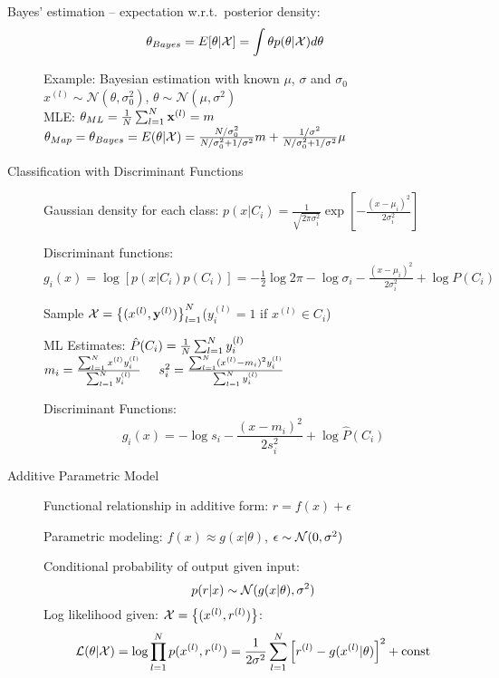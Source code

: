     Bayes' estimation -- expectation w.r.t.\ posterior density:
    \[ \theta_{Bayes} = E[\theta|\mathcal{X}] = \int \theta p(\theta|\mathcal{X})d\theta\]
\begin{description}
\item[] Example: Bayesian estimation with known $\mu$, $\sigma$ and $\sigma_0$\\
        $x^{(l)} \sim \mathcal{N}(\theta, \sigma_0^2)$, 
        $\theta  \sim \mathcal{N}(\mu, \sigma^2)$\\
         MLE: $\theta_{ML} = \frac{1}{N}\sum_{l=1}^N\mathbf{x}^{(l)}=m$ \\
         $\theta_{Map} = \theta_{Bayes}  =E(\theta|\mathcal{X}) = 
            \frac{N/\sigma_0^2}{N/\sigma_0^2+1/\sigma^2} m +
            \frac{1/\sigma^2}{N/\sigma_0^2 + 1/\sigma^2} \mu$

\item[Classification with Discriminant Functions] 
    Gaussian density for each class: $p(x|C_i) = \frac{1}{\sqrt{2\pi
    \sigma^2_i}} \exp\left[ -\frac{(x-\mu_i)^2}{2\sigma_i^2} \right] $

    Discriminant functions:
    $g_i(x) = \log\left[ p(x|C_i)p(C_i) \right] = -\frac{1}{2}\log 2\pi -
    \log\sigma_i -\frac{(x-\mu_i)^2}{2\sigma^2_i} +\log P(C_i)$

    Sample $\mathcal{X} = \left\{ (x^{(l)}, \mathbf{y}^{(l)}) \right\}^N_{l=1}$($y_i^{(l)} = 1$ if
    $x^{(l)}\in C_i$)

    ML Estimates: $\hat{P}(C_i) = \frac{1}{N}\sum_{l=1}^Ny^{(l)}_i$\\
    $m_i = \frac{\sum_{l=1}^N x^{(l)} y^{(l)}_i}{\sum_{l=1}^Ny^{(l)}_i} \hspace{0.5cm} s_i^2=  \frac{\sum_{l=1}^N
    (x^{(l)} - m_i)^2y^{(l)}_i}{\sum_{l=1}^Ny^{(l)}_i} $

    Discriminant Functions: \[g_i(x) = -\log s_i - \frac{(x-m_i)^2}{2s_i^2} +
    \log \hat{P}(C_i)\]
\item[Additive Parametric Model] Functional relationship in additive form:
    $r = f(x) + \epsilon$

    Parametric modeling: $f(x) \approx g(x|\theta)$, $\epsilon \sim \mathcal{N}(0,
    \sigma^2)$

    Conditional probability of output given input:
    \[p(r|x) \sim \mathcal{N}(g(x|\theta), \sigma^2)\]
    Log likelihood given: $\mathcal{X} = \left\{ (x^{(l)}, r^{(l)}) \right\}$:
    \[
        \mathcal{L}(\theta|\mathcal{X}) = \log \prod_{l=1}^N p(x^{(l)}, r^{(l)}) =
        \frac{1}{2\sigma^2}\sum_{l=1}^N\left[ r^{(l)} - g(x^{(l)}|\theta) \right]^2 +
        \mbox{const}
    \]


\end{description}
